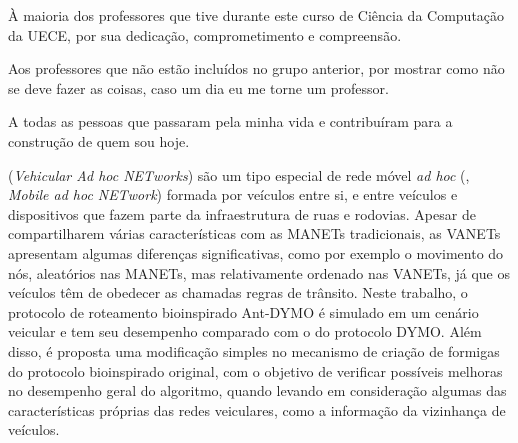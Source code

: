 \noindent
À maioria dos professores que tive durante este curso de Ciência da
Computação da UECE, por sua dedicação, comprometimento e compreensão. 

\noindent
Aos professores que não estão incluídos no grupo anterior, por mostrar
como não se deve fazer as coisas, caso um dia eu me torne um professor.

\noindent
A todas as pessoas que passaram pela minha vida e contribuíram para a
construção de quem sou hoje.

\pagebreak

\makeepigrafe


\begin{resumo}
\noindent
{} (\textit{Vehicular Ad hoc NETworks})
são um tipo especial de rede móvel \textit{ad hoc} (, \textit{Mobile ad hoc NETwork}) formada por veículos entre si, e
entre veículos e dispositivos que fazem parte da infraestrutura de ruas e
rodovias. Apesar de compartilharem várias características com as MANETs
tradicionais, as VANETs apresentam algumas diferenças significativas, como por
exemplo o movimento do nós, aleatórios nas MANETs, mas relativamente ordenado
nas VANETs, já que os veículos têm de obedecer as chamadas regras de trânsito.
Neste trabalho, o protocolo de roteamento bioinspirado Ant-DYMO é simulado em
um cenário veicular e tem seu desempenho comparado com o do protocolo DYMO.
Além disso, é proposta uma modificação simples no mecanismo de criação de
formigas do protocolo bioinspirado original, com o objetivo de verificar
possíveis melhoras no desempenho geral do algoritmo, quando levando em
consideração algumas das características próprias das redes veiculares, como a
informação da vizinhança de veículos.

\vspace{1cm}
\noindent
\palavraschave
\end{resumo}
\pagebreak

